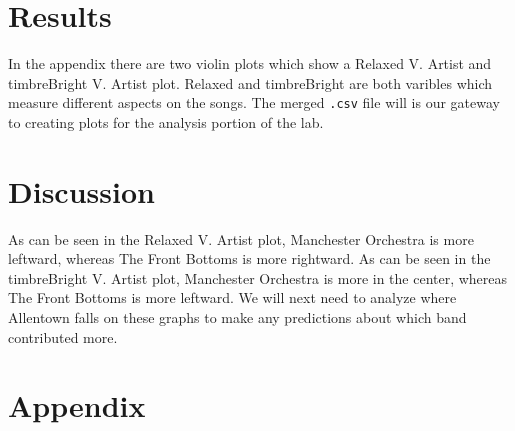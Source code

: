 \documentclass{article}\usepackage[]{graphicx}\usepackage[]{xcolor}
\begin{document}
\begin{multicols}{2}
\section{Results}
In the appendix there are two violin plots which show a Relaxed V. Artist and timbreBright V. Artist plot. Relaxed and timbreBright are both varibles which measure different aspects on the songs. The merged \texttt{.csv} file will is our gateway to creating plots for the analysis portion of the lab.

\section{Discussion}
As can be seen in the Relaxed V. Artist plot, Manchester Orchestra is more leftward, whereas The Front Bottoms is more rightward. As can be seen in the timbreBright V. Artist plot, Manchester Orchestra is more in the center, whereas The Front Bottoms is more leftward. We will next need to analyze where Allentown falls on these graphs to make any predictions about which band contributed more.

\vspace{2em}

\begin{tiny}

\end{tiny}
\end{multicols}

\newpage
\onecolumn
\section{Appendix}
\end{document}
